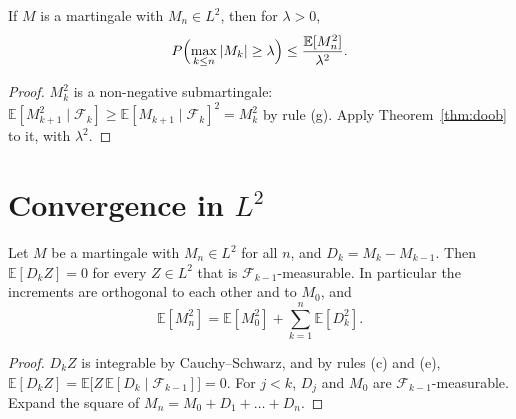 \begin{corollary}\label{cor:kolmogorov}
If $M$ is a martingale with $M_n\in L^2$, then for $\lambda>0$,
\[
P\Bigl(\max_{k\le n}|M_k|\ge\lambda\Bigr)\le\frac{\mathbb E[M_n^2]}{\lambda^2}.
\]
\end{corollary}
\begin{proof}
$M_k^2$ is a non-negative submartingale: $\mathbb E[M_{k+1}^2\mid\mathcal F_k]\ge\mathbb E[M_{k+1}\mid\mathcal F_k]^2=M_k^2$ by rule (g). Apply Theorem~\ref{thm:doob} to it, with $\lambda^2$.
\end{proof}

\section{Convergence in \texorpdfstring{$L^2$}{L2}}

\begin{lemma}\label{lem:orth}
Let $M$ be a martingale with $M_n\in L^2$ for all $n$, and $D_k=M_k-M_{k-1}$. Then $\mathbb E[D_kZ]=0$ for every $Z\in L^2$ that is $\mathcal F_{k-1}$-measurable. In particular the
increments are orthogonal to each other and to $M_0$, and
\[
\mathbb E[M_n^2]=\mathbb E[M_0^2]+\sum_{k=1}^n\mathbb E[D_k^2].
\]
\end{lemma}
\begin{proof}
$D_kZ$ is integrable by Cauchy--Schwarz, and by rules (c) and (e), $\mathbb E[D_kZ]=\mathbb E\bigl[Z\,\mathbb E[D_k\mid\mathcal F_{k-1}]\bigr]=0$. For $j<k$, $D_j$ and $M_0$ are $\mathcal F_{k-1}$-measurable.
Expand the square of $M_n=M_0+D_1+\dots+D_n$.
\end{proof}

